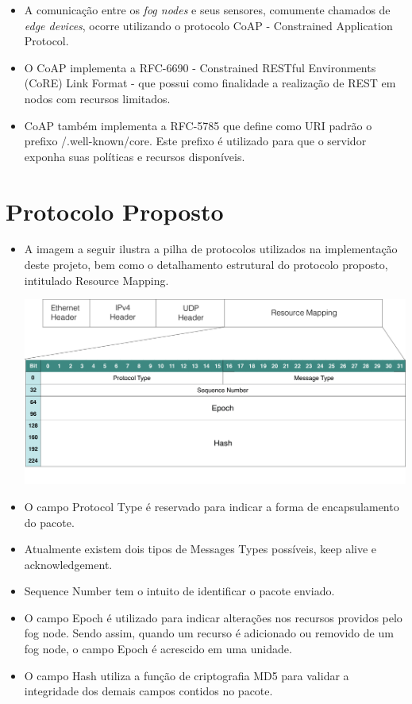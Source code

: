 \documentclass[a0,portrait]{lab-poster}
\begin{document}
\begin{multicols}{2}
\begin{itemize}
\item A comunicação entre os \textit{fog nodes} e seus sensores, comumente chamados de \textit{edge devices}, ocorre utilizando o protocolo CoAP - Constrained Application Protocol.

\item O CoAP implementa a RFC-6690 - Constrained RESTful Environments (CoRE) Link Format - que possui como finalidade a realização de REST em nodos com recursos limitados\cite{rfc6690}.
\item CoAP também implementa a RFC-5785 que define como URI padrão o prefixo /.well-known/core. Este prefixo é utilizado para que o servidor exponha suas políticas e recursos disponíveis\cite{rfc5785}.


\end{itemize}

\section*{\huge Protocolo Proposto}

\Large
\justifying
\begin{itemize}

\item A imagem a seguir ilustra a pilha de protocolos utilizados na implementação deste projeto, bem como o detalhamento estrutural do protocolo proposto, intitulado Resource Mapping.


\begin{center}
\includegraphics[width=0.9\linewidth]{fig/fig2.png}
\end{center}

\item O campo Protocol Type é reservado para indicar a forma de encapsulamento do pacote.
\item Atualmente existem dois tipos de Messages Types possíveis, keep alive e acknowledgement.
\item Sequence Number tem o intuito de identificar o pacote enviado.
\item O campo Epoch é utilizado para indicar alterações nos recursos providos pelo fog node.
Sendo assim, quando um recurso é adicionado ou removido de um fog node, o campo Epoch é acrescido em uma unidade.
\item O campo Hash utiliza a função de criptografia MD5 para validar a integridade dos demais campos contidos no pacote.


\end{itemize}
\end{multicols}
\end{document}
